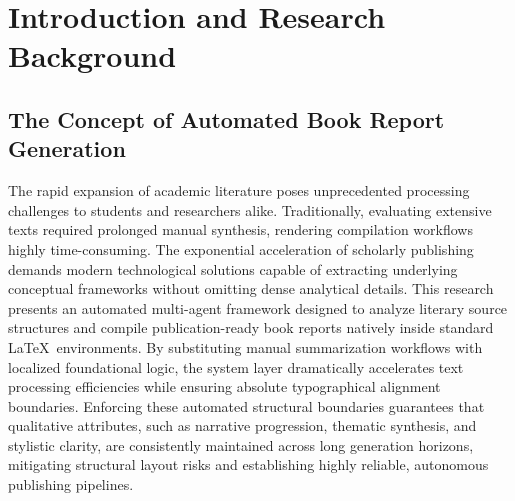 \newpage
\tableofcontents
\newpage


\section{Introduction and Research Background}

\subsection{The Concept of Automated Book Report Generation}
The rapid expansion of academic literature poses unprecedented processing challenges to students and researchers alike. Traditionally, evaluating extensive texts required prolonged manual synthesis, rendering compilation workflows highly time-consuming. The exponential acceleration of scholarly publishing demands modern technological solutions capable of extracting underlying conceptual frameworks without omitting dense analytical details. This research presents an automated multi-agent framework designed to analyze literary source structures and compile publication-ready book reports natively inside standard \LaTeX\ environments. By substituting manual summarization workflows with localized foundational logic, the system layer dramatically accelerates text processing efficiencies while ensuring absolute typographical alignment boundaries. Enforcing these automated structural boundaries guarantees that qualitative attributes, such as narrative progression, thematic synthesis, and stylistic clarity, are consistently maintained across long generation horizons, mitigating structural layout risks and establishing highly reliable, autonomous publishing pipelines.

